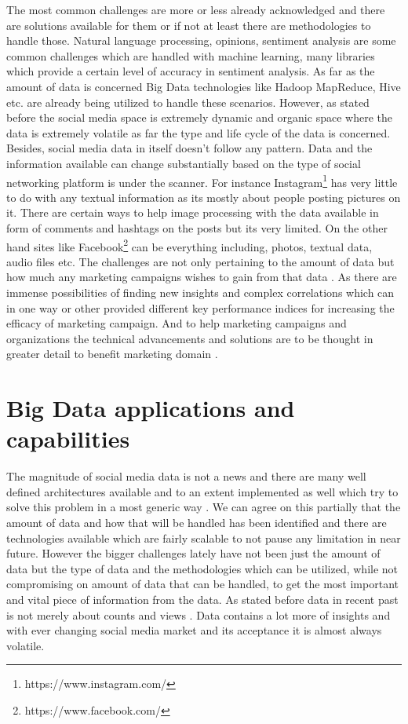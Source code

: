 \documentclass[sigconf]{acmart}
\begin{document}
The most common challenges are more or less already acknowledged and there are solutions available for them or if not at least there are methodologies to handle those. Natural language processing, opinions, sentiment analysis are some common challenges which are handled with machine learning, many libraries which provide a certain level of accuracy in sentiment analysis. As far as the amount of data is concerned Big Data technologies like Hadoop MapReduce, Hive etc. are already being utilized to handle these scenarios. However, as stated before the social media space is extremely dynamic and organic space where the data is extremely volatile as far the type and life cycle of the data is concerned.  Besides, social media data in itself doesn't follow any pattern. Data and the information available can change substantially based on the type of social networking platform is under the scanner. For instance Instagram\footnote{https://www.instagram.com/} has very little to do with any textual information as its mostly about people posting pictures on it. There are certain ways to help image processing with the data available in form of comments and hashtags on the posts but its very limited. On the other hand sites like Facebook\footnote{https://www.facebook.com/} can be everything including, photos, textual data, audio files etc. The challenges are not only pertaining to the amount of data but how much any marketing campaigns wishes to gain from that data \cite{HOFACKER201673}. As there are immense possibilities of finding new insights and complex correlations which can in one way or other provided different key performance indices for increasing the efficacy of marketing campaign. And to help marketing campaigns and organizations the technical advancements and solutions are to be thought in greater detail to benefit marketing domain \cite{AMADO2017}.

\section{Big Data applications and capabilities}
The magnitude of social media data is not a news and there are many well defined architectures available and to an extent implemented as well which try to solve this problem in a most generic way \cite{Olshannikova2017}. We can agree on this partially that the amount of data and how that will be handled has been identified and there are technologies available which are fairly scalable to not pause any limitation in near future. However the bigger challenges lately have not been just the amount of data but the type of data and the methodologies which can be utilized, while not compromising on amount of data that can be handled, to get the most important and vital piece of information from the data. As stated before data in recent past is not merely about counts and views \cite{mylynnfelt}. Data contains a lot more of insights and with ever changing social media market and its acceptance it is almost always volatile.
\end{document}
